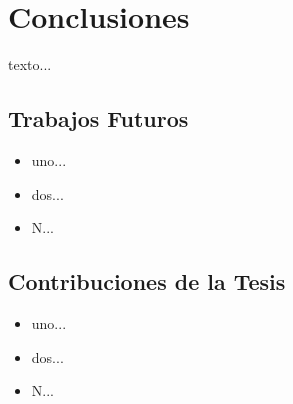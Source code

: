 \chapter[Conclusiones]{\label{ch:conclusiones}Conclusiones}

texto...


\section{Trabajos Futuros}

\begin{itemize}
\item uno...
\item dos...
\item N...
\end{itemize}


\section{Contribuciones de la Tesis}

\begin{itemize}
\item uno...
\item dos...
\item N...
\end{itemize}
